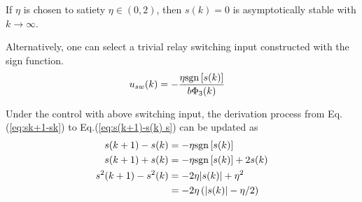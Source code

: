 \documentclass[10pt,final,journal]{IEEEtran}
\newcommand\sgn{{\rm sgn}}
\begin{document}
	If $\eta$ is chosen to satiety $\eta\in(0,2)$, then $s(k)=0$ is asymptotically stable with $k\to\infty$. 
	
	Alternatively, one can select a trivial relay switching input constructed with the sign function.
	\begin{align}
		u_{sw}(k) &= -\frac{\eta \sgn \left[s(k)\right]}{b\Phi_3(k)}
	\end{align}

	Under the control with above switching input, the derivation process from Eq.(\ref{eq:sk+1-sk}) to Eq.(\ref{eq:s(k+1)-s(k) s}) can be updated as
	\begin{align}\begin{split}\label{eq:s(k+1)-s(k)}
		s(k+1)-s(k) &= -\eta \sgn\left[s(k)\right]\\
		s(k+1)+s(k) &= -\eta \sgn\left[s(k)\right]+2s(k)\\
		s^2(k+1)-s^2(k) &= -2\eta\vert s(k)\vert+\eta^2\\
		&=-2\eta\left(\vert s(k)\vert-\eta/2\right)
	\end{split}\end{align}
\end{document}
